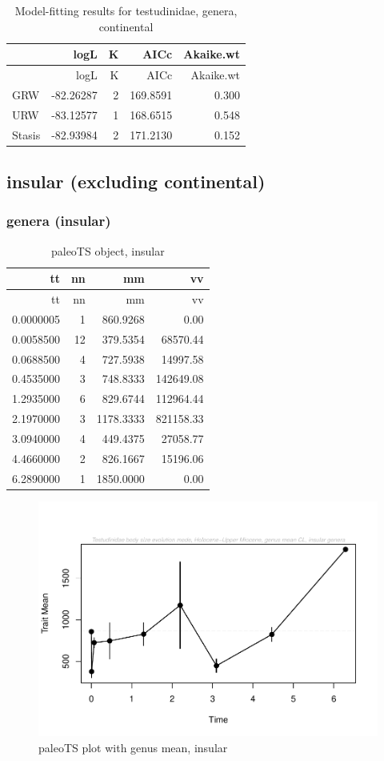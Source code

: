 \documentclass[]{article}
\begin{document}
\begin{longtable}[]{@{}lrrrr@{}}
\caption{Model-fitting results for testudinidae, genera,
continental}\tabularnewline
\toprule
& logL & K & AICc & Akaike.wt\tabularnewline
\midrule
\endfirsthead
\toprule
& logL & K & AICc & Akaike.wt\tabularnewline
\midrule
\endhead
GRW & -82.26287 & 2 & 169.8591 & 0.300\tabularnewline
URW & -83.12577 & 1 & 168.6515 & 0.548\tabularnewline
Stasis & -82.93984 & 2 & 171.2130 & 0.152\tabularnewline
\bottomrule
\end{longtable}

\newpage

\subsection{insular (excluding
continental)}\label{insular-excluding-continental}

\subsubsection{genera (insular)}\label{genera-insular}

\begin{longtable}[]{@{}rrrr@{}}
\caption{paleoTS object, insular}\tabularnewline
\toprule
tt & nn & mm & vv\tabularnewline
\midrule
\endfirsthead
\toprule
tt & nn & mm & vv\tabularnewline
\midrule
\endhead
0.0000005 & 1 & 860.9268 & 0.00\tabularnewline
0.0058500 & 12 & 379.5354 & 68570.44\tabularnewline
0.0688500 & 4 & 727.5938 & 14997.58\tabularnewline
0.4535000 & 3 & 748.8333 & 142649.08\tabularnewline
1.2935000 & 6 & 829.6744 & 112964.44\tabularnewline
2.1970000 & 3 & 1178.3333 & 821158.33\tabularnewline
3.0940000 & 4 & 449.4375 & 27058.77\tabularnewline
4.4660000 & 2 & 826.1667 & 15196.06\tabularnewline
6.2890000 & 1 & 1850.0000 & 0.00\tabularnewline
\bottomrule
\end{longtable}

\begin{figure}[htbp]
\centering
\includegraphics{MA_JJ_files/figure-latex/paleoTSI-1.pdf}
\caption{paleoTS plot with genus mean, insular}
\end{figure}
\end{document}
